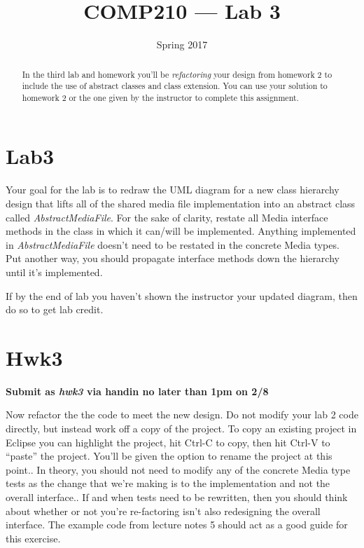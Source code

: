 \documentclass[]{tufte-handout}
\title{COMP210 --- Lab 3}
\author{}
\date{ Spring 2017 }
\begin{document}
\maketitle

\begin{abstract}
In the third lab and homework you'll be \textit{refactoring} your design from homework 2 to include the use of abstract classes and class extension. You can use your solution to homework 2 or the one given by the instructor to complete this assignment.
\end{abstract}

\section*{Lab3}

Your goal for the lab is to redraw the UML diagram for a new class hierarchy design that lifts all of the shared media file implementation into an abstract class called \textit{AbstractMediaFile}. For the sake of clarity, restate all Media interface methods in the class in which it can/will be implemented. Anything implemented in \textit{AbstractMediaFile} doesn't need to be restated in the concrete Media types. Put another way, you should propagate interface methods down the hierarchy until it's implemented.

If by the end of lab you haven't shown the instructor your updated diagram, then do so to get lab credit.

\section*{Hwk3}

\begin{center}
\textbf{Submit as \textit{hwk3} via handin no later than 1pm on 2/8}
\end{center}

Now refactor the the code to meet the new design. Do not modify your lab 2 code directly, but instead work off a copy of the project. To copy an existing project in Eclipse you can highlight the project, hit Ctrl-C to copy, then hit Ctrl-V to ``paste'' the project. You'll be given the option to rename the project at this point.. In theory, you should not need to modify any of the concrete Media type tests as the change that we're making is to the implementation and not the overall interface.. If and when tests need to be rewritten, then you should think about whether or not you're re-factoring isn't also redesigning the overall interface. The example code from lecture notes 5 should act as a good guide for this exercise.
\end{document}
